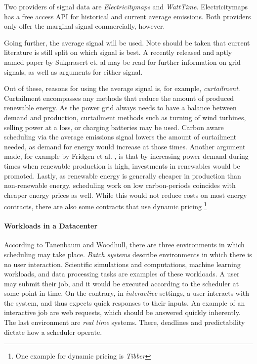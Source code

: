 Two providers of signal data are \emph{Electricitymaps} and \emph{WattTime}.
Electricitymaps has a free access API for historical and current average emissions. Both providers only offer the marginal signal commercially, however. 

Going further, the average signal will be used. 
Note should be taken that current literature is still split on which signal is best. 
A recently released and aptly named paper by Sukprasert et. al \cite{sukprasert_limitations_2024} may be read for further information on grid signals, as well as arguments for either signal.

Out of these, reasons for using the average signal is, for example, \emph{curtailment}. 
Curtailment encompasses any methods that reduce the amount of produced renewable energy. As the power grid always needs to have a balance between demand and production, curtailment methods such as turning of wind turbines, selling power at a loss, or charging batteries may be used. 
Carbon aware scheduling via the average emissions signal lowers the amount of curtailment needed, as demand for energy would increase at those times.
Another argument made, for example by Fridgen et al. \cite{fridgen_not_2021}, is that by increasing power demand during times when renewable production is high, investments in renewables would be promoted. 
Lastly, as renewable energy is generally cheaper in production than non-renewable energy, scheduling work on low carbon-periods coincides with cheaper energy prices as well. While this would not reduce costs on most energy contracts, there are also some contracts that use dynamic pricing \footnote{One example for dynamic pricing is \emph{Tibber}}

\paragraph{Workloads in a Datacenter} According to Tanenbaum and Woodhull\cite{tanenbaum_operating_2006}, there are three environments in which scheduling may take place. \emph{Batch systems} describe environments in which there is no user interaction. 
Scientific simulations and computations, machine learning workloads, and data processing tasks are examples of these workloads\cite{sukprasert_limitations_2024}.
A user may submit their job, and it would be executed according to the scheduler at some point in time. 
On the contrary, in \emph{interactive} settings, a user interacts with the system, and thus expects quick responses to their inputs. An example of an interactive job are web requests, which should be answered quickly inherently.
The last environment are \emph{real time} systems. There, deadlines and predictability dictate how a scheduler operate.

